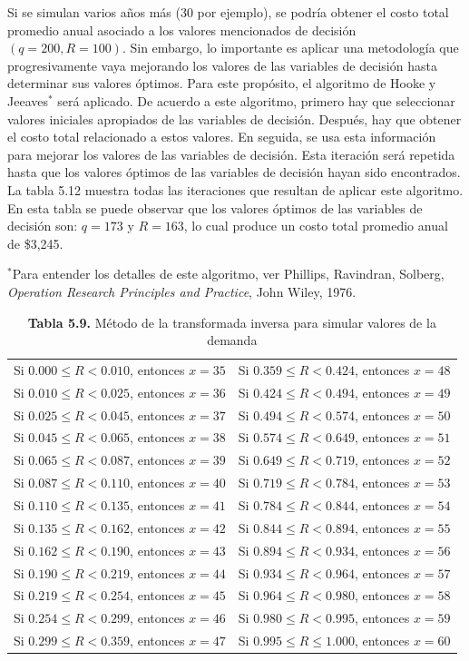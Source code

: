\documentclass[11pt,letterpaper]{report}
\begin{document}
Si se simulan varios años más (30 por ejemplo), se podría obtener el costo
total promedio anual asociado a los valores mencionados de decisión
$(q=200, R=100)$. Sin embargo, lo importante es aplicar una metodología que
progresivamente vaya mejorando los valores de las variables de decisión
hasta determinar sus valores óptimos. Para este propósito, el algoritmo de
Hooke y Jeeaves$^{*}$ será aplicado. De acuerdo a este algoritmo, primero
hay que seleccionar valores iniciales apropiados de las variables de
decisión. Después, hay que obtener el costo total relacionado a estos
valores. En seguida, se usa esta información para mejorar los valores de las
variables de decisión. Esta iteración será repetida hasta que los valores
óptimos de las variables de decisión hayan sido encontrados. La tabla 5.12
muestra todas las iteraciones que resultan de aplicar este algoritmo. En
esta tabla se puede observar que los valores óptimos de las variables de
decisión son: $q=173$ y $R=163$, lo cual produce un costo total promedio
anual de \$3,245.

{\footnotesize $^{*}$Para entender los detalles de este algoritmo, ver
Phillips, Ravindran, Solberg, \emph{Operation Research Principles and
Practice}, John Wiley, 1976.}

\begin{table}[H]
\centering
\caption*{\textbf{Tabla 5.9.} Método de la transformada inversa para simular valores de la demanda}
\begin{tabular}{ll}
Si $0.000 \le R < 0.010$, entonces $x=35$ & Si $0.359 \le R < 0.424$, entonces $x=48$ \\
Si $0.010 \le R < 0.025$, entonces $x=36$ & Si $0.424 \le R < 0.494$, entonces $x=49$ \\
Si $0.025 \le R < 0.045$, entonces $x=37$ & Si $0.494 \le R < 0.574$, entonces $x=50$ \\
Si $0.045 \le R < 0.065$, entonces $x=38$ & Si $0.574 \le R < 0.649$, entonces $x=51$ \\
Si $0.065 \le R < 0.087$, entonces $x=39$ & Si $0.649 \le R < 0.719$, entonces $x=52$ \\
Si $0.087 \le R < 0.110$, entonces $x=40$ & Si $0.719 \le R < 0.784$, entonces $x=53$ \\
Si $0.110 \le R < 0.135$, entonces $x=41$ & Si $0.784 \le R < 0.844$, entonces $x=54$ \\
Si $0.135 \le R < 0.162$, entonces $x=42$ & Si $0.844 \le R < 0.894$, entonces $x=55$ \\
Si $0.162 \le R < 0.190$, entonces $x=43$ & Si $0.894 \le R < 0.934$, entonces $x=56$ \\
Si $0.190 \le R < 0.219$, entonces $x=44$ & Si $0.934 \le R < 0.964$, entonces $x=57$ \\
Si $0.219 \le R < 0.254$, entonces $x=45$ & Si $0.964 \le R < 0.980$, entonces $x=58$ \\
Si $0.254 \le R < 0.299$, entonces $x=46$ & Si $0.980 \le R < 0.995$, entonces $x=59$ \\
Si $0.299 \le R < 0.359$, entonces $x=47$ & Si $0.995 \le R \le 1.000$, entonces $x=60$ \\
\end{tabular}
\end{table}
\end{document}
